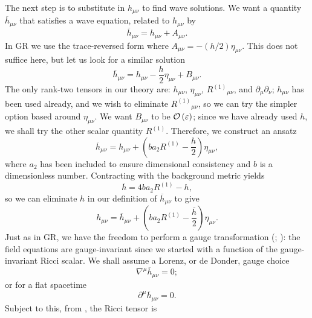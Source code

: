 The next step is to substitute in $h_{\mu\nu}$ to find wave solutions. We want a quantity $\overline{h}_{\mu\nu}$ that satisfies a wave equation, related to $h_{\mu\nu}$ by
\begin{equation}
\overline{h}_{\mu\nu} = h_{\mu\nu} + A_{\mu\nu}.
\end{equation}
In GR we use the trace-reversed form where $A_{\mu\nu} = -(h/2)\eta_{\mu\nu}$. This does not suffice here, but let us look for a similar solution
\begin{equation}
\overline{h}_{\mu\nu} = h_{\mu\nu} - \frac{h}{2}\eta_{\mu\nu} + B_{\mu\nu}.
\end{equation}
The only rank-two tensors in our theory are: $h_{\mu\nu}$, $\eta_{\mu\nu}$, ${R^{(1)}}_{\mu\nu}$, and $\partial_\mu\partial_\nu$; $h_{\mu\nu}$ has been used already, and we wish to eliminate ${R^{(1)}}_{\mu\nu}$, so we can try the simpler option based around $\eta_{\mu\nu}$. We want $B_{\mu\nu}$ to be $\mathcal{O}\left({\varepsilon}\right)$; since we have already used $h$, we shall try the other scalar quantity $R^{(1)}$. Therefore, we construct an ansatz
\begin{equation}
\overline{h}_{\mu\nu} = h_{\mu\nu} + \left(b a_2 R^{(1)} - \frac{h}{2}\right)\eta_{\mu\nu},
\label{eq:Ansatz}
\end{equation}
where $a_2$ has been included to ensure dimensional consistency and $b$ is a dimensionless number. Contracting with the background metric yields
\begin{equation}
\overline{h} = 4b a_2 R^{(1)} - h,
\label{eq:h_trace}
\end{equation}
so we can eliminate $h$ in our definition of $\overline{h}_{\mu\nu}$ to give
\begin{equation}
h_{\mu\nu} = \overline{h}_{\mu\nu} + \left(b a_2 R^{(1)} -\frac{\overline{h}}{2}\right)\eta_{\mu\nu}.
\end{equation}
Just as in GR, we have the freedom to perform a gauge transformation (\citealt[box 18.2]{Misner1973}; \citealt[section 17.1]{Hobson2006}): the field equations are gauge-invariant since we started with a function of the gauge-invariant Ricci scalar. We shall assume a Lorenz, or de Donder, gauge choice
\begin{equation}
\nabla^\mu \overline{h}_{\mu\nu} = 0;
\end{equation}
or for a flat spacetime
\begin{equation}
\partial^\mu \overline{h}_{\mu\nu} = 0.
\label{eq:Lorenz}
\end{equation}
Subject to this, from , the Ricci tensor is
